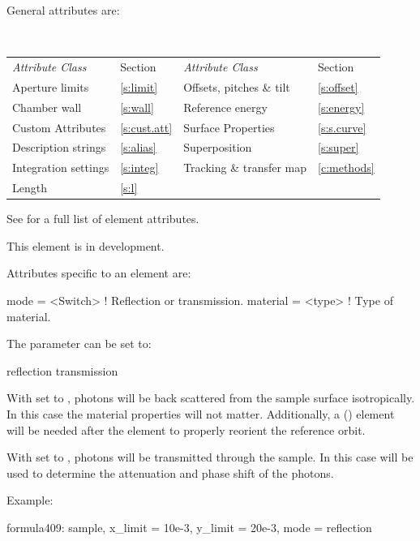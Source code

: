 {General  attributes are:
\begin{center}
\tt
\begin{tabular}{llll} \toprule
  {\sl Attribute Class}      & Section           & {\sl Attribute Class}      & Section         \\
  Aperture limits            & \ref{s:limit}     & Offsets, pitches \& tilt   & \ref{s:offset}  \\ \midrule
  Chamber wall               & \ref{s:wall}      & Reference energy           & \ref{s:energy}  \\ 
  Custom Attributes          & \ref{s:cust.att}  & Surface Properties         & \ref{s:s.curve} \\
  Description strings        & \ref{s:alias}     & Superposition              & \ref{s:super}   \\
  Integration settings       & \ref{s:integ}     & Tracking \& transfer map   & \ref{c:methods} \\
  Length                     & \ref{s:l}         &                            &                 \\
  \bottomrule
\end{tabular}
\end{center}
\toffset
See  for a full list of element attributes.

This element is in development.

Attributes specific to an  element are:
\begin{example}
  mode       = <Switch> ! Reflection or transmission.
  material   = <type>   ! Type of material. 
\end{example}

The  parameter can be set to:
\begin{example}
  reflection
  transmission
\end{example}
With  set to , photons will be back scattered
from the sample surface isotropically. In this case the material
properties will not matter. Additionally, a 
() element will be needed after the  element
to properly reorient the reference orbit.

With  set to , photons will be transmitted
through the sample. In this case  will be used to
determine the attenuation and phase shift of the photons.

Example:
\begin{example}
  formula409: sample, x_limit = 10e-3, y_limit = 20e-3, mode = reflection
\end{example}

}
